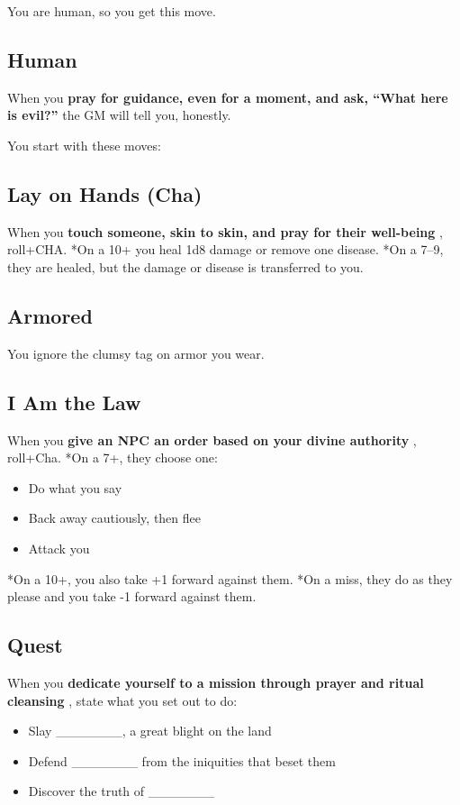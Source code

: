  You are human, so you get this move.
\subsection{Human}


 When you \textbf{pray for guidance, even for a moment, and ask, ``What here is evil?''}
 the GM will tell you, honestly.


 You start with these moves:
\subsection{Lay on Hands (Cha)}


 When you \textbf{touch someone, skin to skin, and pray for their well-being }
, roll+CHA. *On a 10+ you heal 1d8 damage or remove one disease. *On a 7--9, they are healed, but the damage or disease is transferred to you.
\subsection{Armored}


 You ignore the clumsy tag on armor you wear.
\subsection{I Am the Law}


 When you \textbf{give an NPC an order based on your divine authority}
, roll+Cha. *On a 7+, they choose one:
\begin{itemize}
\item Do what you say
\item Back away cautiously, then flee
\item Attack you

\end{itemize}


 *On a 10+, you also take +1 forward against them. *On a miss, they do as they please and you take -1 forward against them.
\subsection{Quest}


 When you \textbf{dedicate yourself to a mission through prayer and ritual cleansing}
, state what you set out to do:
\begin{itemize}
\item Slay \_\_\_\_\_\_\_, a great blight on the land
\item Defend \_\_\_\_\_\_\_ from the iniquities that beset them
\item Discover the truth of \_\_\_\_\_\_\_

\end{itemize}



